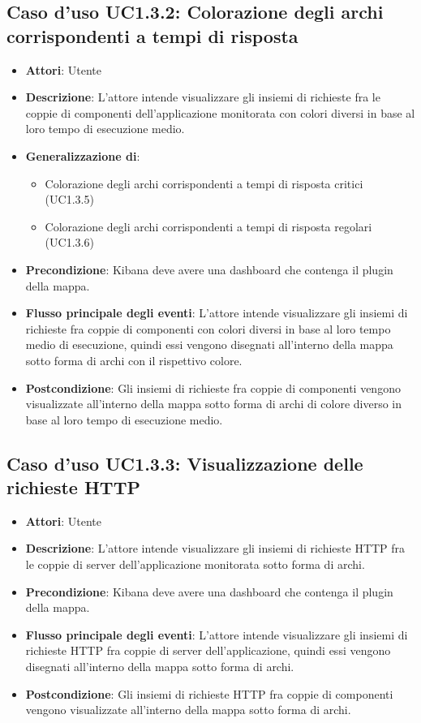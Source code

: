 \subsection{Caso d'uso UC1.3.2: Colorazione degli archi corrispondenti a tempi di risposta}
\begin{itemize}
	\item \textbf{Attori}: Utente
	\item \textbf{Descrizione}: L'attore intende visualizzare gli insiemi di richieste fra le coppie di componenti dell'applicazione monitorata con colori diversi in base al loro tempo di esecuzione medio.
	\item 	\textbf{Generalizzazione di}:
	\begin{itemize}
		\item Colorazione degli archi corrispondenti a tempi di risposta critici (UC1.3.5)
		\item Colorazione degli archi corrispondenti a tempi di risposta regolari  (UC1.3.6)
	\end{itemize}
	\item \textbf{Precondizione}: Kibana deve avere una dashboard che contenga il plugin della mappa.
	\item \textbf{Flusso principale degli eventi}: L'attore intende visualizzare gli insiemi di richieste fra coppie di componenti con colori diversi in base al loro tempo medio di esecuzione, quindi essi vengono disegnati all'interno della mappa sotto forma di archi con il rispettivo colore.
	\item \textbf{Postcondizione}: Gli insiemi di richieste fra coppie di componenti vengono visualizzate all'interno della mappa sotto forma di archi di colore diverso in base al loro tempo di esecuzione medio.
\end{itemize}
\subsection{Caso d'uso UC1.3.3: Visualizzazione delle richieste HTTP}
\begin{itemize}
	\item \textbf{Attori}: Utente
	\item \textbf{Descrizione}: L'attore intende visualizzare gli insiemi di richieste HTTP fra le coppie di server dell'applicazione monitorata sotto forma di archi.
	\item \textbf{Precondizione}: Kibana deve avere una dashboard che contenga il plugin della mappa.
	\item \textbf{Flusso principale degli eventi}: L'attore intende visualizzare gli insiemi di richieste HTTP fra coppie di server dell'applicazione, quindi essi vengono disegnati all'interno della mappa sotto forma di archi.
	\item \textbf{Postcondizione}: Gli insiemi di richieste HTTP fra coppie di componenti vengono visualizzate all'interno della mappa sotto forma di archi.
\end{itemize}
